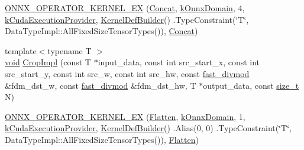 \begin{DoxyCompactItemize}
\item 
\mbox{\hyperlink{namespaceonnxruntime_1_1cuda_acd55fa00e3d78beba088900cd5e60b02}{O\+N\+N\+X\+\_\+\+O\+P\+E\+R\+A\+T\+O\+R\+\_\+\+K\+E\+R\+N\+E\+L\+\_\+\+EX}} (\mbox{\hyperlink{classonnxruntime_1_1cuda_1_1Concat}{Concat}}, \mbox{\hyperlink{namespaceonnxruntime_ac0e7c0c106a2c9e9594560a3ab289fa0}{k\+Onnx\+Domain}}, 4, \mbox{\hyperlink{namespaceonnxruntime_a73ebc64887ddd1968e3cef47ffefe35b}{k\+Cuda\+Execution\+Provider}}, \mbox{\hyperlink{classonnxruntime_1_1KernelDefBuilder}{Kernel\+Def\+Builder}}() .Type\+Constraint(\char`\"{}T\char`\"{}, Data\+Type\+Impl\+::\+All\+Fixed\+Size\+Tensor\+Types()), \mbox{\hyperlink{classonnxruntime_1_1cuda_1_1Concat}{Concat}})
\item 
{\footnotesize template$<$typename T $>$ }\\\mbox{\hyperlink{mlasi_8h_a88f941d423cb2a819b70a1358982b1a6}{void}} \mbox{\hyperlink{namespaceonnxruntime_1_1cuda_a3329fe7e028acb06f43ca214ea317902}{Crop\+Impl}} (const T $\ast$input\+\_\+data, const int src\+\_\+start\+\_\+x, const int src\+\_\+start\+\_\+y, const int src\+\_\+w, const int src\+\_\+hw, const \mbox{\hyperlink{classonnxruntime_1_1cuda_1_1fast__divmod}{fast\+\_\+divmod}} \&fdm\+\_\+dst\+\_\+w, const \mbox{\hyperlink{classonnxruntime_1_1cuda_1_1fast__divmod}{fast\+\_\+divmod}} \&fdm\+\_\+dst\+\_\+hw, T $\ast$output\+\_\+data, const \mbox{\hyperlink{mlasi_8h_a503efbc1c6e50825320ad909366b78ab}{size\+\_\+t}} N)
\item 
\mbox{\hyperlink{namespaceonnxruntime_1_1cuda_a105d360d973327e6e9711b8b2aca7460}{O\+N\+N\+X\+\_\+\+O\+P\+E\+R\+A\+T\+O\+R\+\_\+\+K\+E\+R\+N\+E\+L\+\_\+\+EX}} (\mbox{\hyperlink{classonnxruntime_1_1cuda_1_1Flatten}{Flatten}}, \mbox{\hyperlink{namespaceonnxruntime_ac0e7c0c106a2c9e9594560a3ab289fa0}{k\+Onnx\+Domain}}, 1, \mbox{\hyperlink{namespaceonnxruntime_a73ebc64887ddd1968e3cef47ffefe35b}{k\+Cuda\+Execution\+Provider}}, \mbox{\hyperlink{classonnxruntime_1_1KernelDefBuilder}{Kernel\+Def\+Builder}}() .Alias(0, 0) .Type\+Constraint(\char`\"{}T\char`\"{}, Data\+Type\+Impl\+::\+All\+Fixed\+Size\+Tensor\+Types()), \mbox{\hyperlink{classonnxruntime_1_1cuda_1_1Flatten}{Flatten}})
\item 

\end{DoxyCompactItemize}
